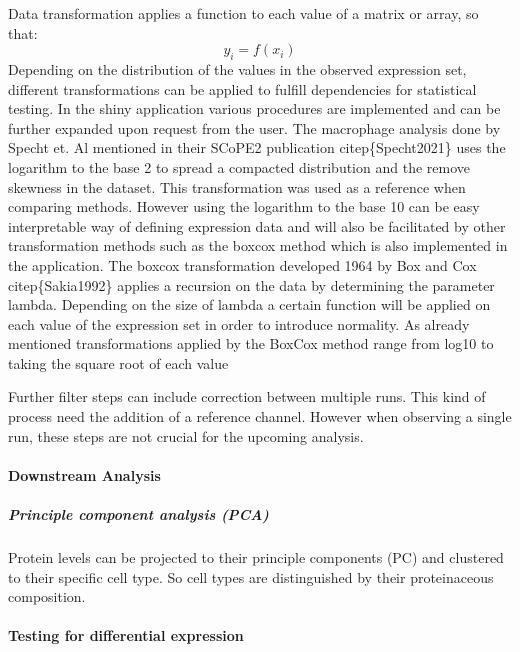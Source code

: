 \documentclass[
]{article}
\begin{document}
Data transformation applies a function to each value of a matrix or
array, so that: \[
y_i = f(x_i)
\] Depending on the distribution of the values in the observed
expression set, different transformations can be applied to fulfill
dependencies for statistical testing. In the shiny application various
procedures are implemented and can be further expanded upon request from
the user. The macrophage analysis done by Specht et. Al mentioned in
their SCoPE2 publication citep\{Specht2021\} uses the logarithm to the
base 2 to spread a compacted distribution and the remove skewness in the
dataset. This transformation was used as a reference when comparing
methods. However using the logarithm to the base 10 can be easy
interpretable way of defining expression data and will also be
facilitated by other transformation methods such as the boxcox method
which is also implemented in the application. The boxcox transformation
developed 1964 by Box and Cox citep\{Sakia1992\} applies a recursion on
the data by determining the parameter lambda. Depending on the size of
lambda a certain function will be applied on each value of the
expression set in order to introduce normality. As already mentioned
transformations applied by the BoxCox method range from log10 to taking
the square root of each value

Further filter steps can include correction between multiple runs. This
kind of process need the addition of a reference channel. However when
observing a single run, these steps are not crucial for the upcoming
analysis.

\hypertarget{downstream-analysis}{%
\paragraph{Downstream Analysis}\label{downstream-analysis}}

\hypertarget{principle-component-analysis-pca}{%
\subparagraph{Principle component analysis
(PCA)}\label{principle-component-analysis-pca}}

Protein levels can be projected to their principle components (PC) and
clustered to their specific cell type. So cell types are distinguished
by their proteinaceous composition.

\hypertarget{testing-for-differential-expression}{%
\paragraph{Testing for differential
expression}\label{testing-for-differential-expression}}
\end{document}
